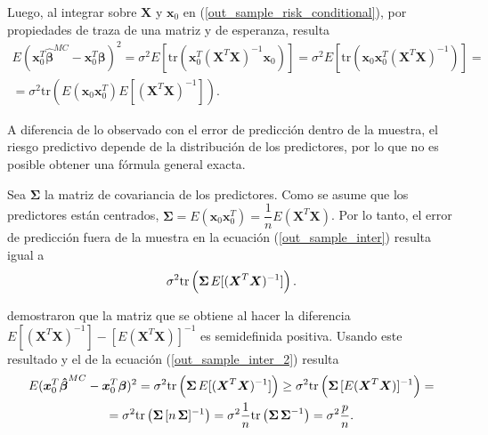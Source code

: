 \documentclass[a4paper,12pt]{report}
\begin{document}
Luego, al integrar sobre $\boldsymbol{X}$ y $\boldsymbol{x}_0$ en (\ref{out_sample_risk_conditional}), por propiedades de traza de una matriz y de esperanza, resulta
\begin{gather}
\nonumber
E(\boldsymbol{x}_0^T\boldsymbol{\hat{\beta}}^{MC}-\boldsymbol{x}_0^T\boldsymbol{\beta})^2 =
\sigma^2E[\text{tr}(\boldsymbol{x}_0^T(\boldsymbol{X}^T\boldsymbol{X})^{-1}\boldsymbol{x}_0)] =
\sigma^2E[\text{tr}(\boldsymbol{x}_0\boldsymbol{x}_0^T(\boldsymbol{X}^T\boldsymbol{X})^{-1})] = \\
\label{out_sample_inter}
=\sigma^2\text{tr}\left(E(\boldsymbol{x}_0\boldsymbol{x}_0^T)E[(\boldsymbol{X}^T\boldsymbol{X})^{-1}]\right).
\end{gather}

A diferencia de lo observado con el error de predicción dentro de la muestra, el riesgo predictivo depende de la distribución de los predictores, por lo que no es posible obtener una fórmula general exacta.

Sea $\boldsymbol{\Sigma}$ la matriz de covariancia de los predictores. Como se asume que los predictores están centrados, $\boldsymbol{\Sigma}=E(\boldsymbol{x}_0\boldsymbol{x}_0^T)=\dfrac{1}{n}E(\boldsymbol{X}^T\boldsymbol{X})$. Por lo tanto, el error de predicción fuera de la muestra en la ecuación (\ref{out_sample_inter}) resulta igual a
\begin{equation}
\label{out_sample_inter_2}
\sigma^2\text{tr}\left( \boldsymbol{\Sigma} \hspace{0.05cm} E[(\boldsymbol{X}^T\boldsymbol{X})^{-1}]\right).
\end{equation}

\citet{groves1969note} demostraron que la matriz que se obtiene al hacer la diferencia $E[(\boldsymbol{X}^T\boldsymbol{X})^{-1}]-[E(\boldsymbol{X}^T\boldsymbol{X})]^{-1}$ es semidefinida positiva. Usando este resultado y el de la ecuación (\ref{out_sample_inter_2}) resulta
\begin{gather}
\nonumber
E(\boldsymbol{x}_0^T\boldsymbol{\hat{\beta}}^{MC}-\boldsymbol{x}_0^T\boldsymbol{\beta})^2 =
\sigma^2\text{tr}\left( \boldsymbol{\Sigma} \hspace{0.05cm} E[(\boldsymbol{X}^T\boldsymbol{X})^{-1}]\right) \geq 
\sigma^2\text{tr}\left( \boldsymbol{\Sigma} \hspace{0.05cm} [E(\boldsymbol{X}^T\boldsymbol{X})]^{-1}\right) = \\
=\sigma^2\text{tr}\left( \boldsymbol{\Sigma} \hspace{0.05cm} [n\hspace{0.05cm} \boldsymbol{\Sigma}]^{-1}\right) = 
\sigma^2\frac{1}{n}\text{tr}\left( \boldsymbol{\Sigma} \hspace{0.05cm} \boldsymbol{\Sigma}^{-1}\right) =
\sigma^2\frac{p}{n}.
\end{gather}
\end{document}
